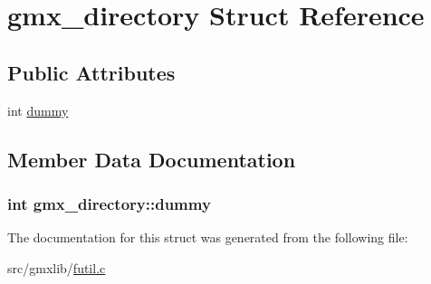 \hypertarget{structgmx__directory}{\section{gmx\-\_\-directory \-Struct \-Reference}
\label{structgmx__directory}
}
\subsection*{\-Public \-Attributes}
\begin{DoxyCompactItemize}
\item 
int \hyperlink{structgmx__directory_a22e19cb51e2de284fd0549db24b7de13}{dummy}
\end{DoxyCompactItemize}


\subsection{\-Member \-Data \-Documentation}
\hypertarget{structgmx__directory_a22e19cb51e2de284fd0549db24b7de13}{
\subsubsection[{dummy}]{\setlength{\rightskip}{0pt plus 5cm}int {\bf gmx\-\_\-directory\-::dummy}}}\label{structgmx__directory_a22e19cb51e2de284fd0549db24b7de13}


\-The documentation for this struct was generated from the following file\-:\begin{DoxyCompactItemize}
\item 
src/gmxlib/\hyperlink{futil_8c}{futil.\-c}\end{DoxyCompactItemize}
